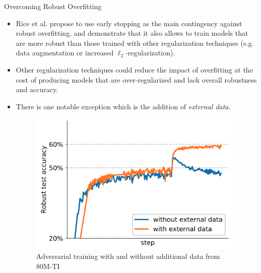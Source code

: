 \begin{frame}{Overcoming Robust Overfitting}
    \begin{itemize}
        \item Rice et al. propose to use early stopping as the main contingency against robust overfitting, and demonstrate that it also allows to train models that are more robust than those trained with other regularization techniques (e.g. data augmentation or increased $\ell_2$-regularization).
        \item Other regularization techniques could reduce the impact of overfitting at the cost of producing models that are over-regularized and lack overall robustness and accuracy.
        \item There is one notable exception which is the addition of \emph{external data}.
        \begin{figure}
            \centering
            \includegraphics[height=.4\textheight]{pic/external_data.png}
            \caption{Adversarial training with and without additional data from 80M-TI}
            \label{fig:external_data}
        \end{figure}
    \end{itemize}
\end{frame}


